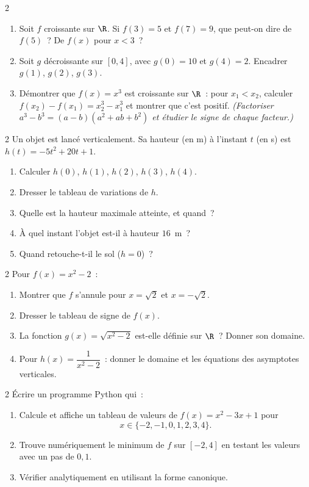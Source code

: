 \begin{exo}{2}
\begin{enumerate}
  \item Soit $f$ croissante sur $\R$. Si $f(3)=5$ et $f(7)=9$, que peut-on
        dire de $f(5)$~? De $f(x)$ pour $x<3$~?
  \item Soit $g$ d\'ecroissante sur $[0,4]$, avec $g(0)=10$ et $g(4)=2$.
        Encadrer $g(1)$, $g(2)$, $g(3)$.
  \item D\'emontrer que $f(x)=x^3$ est croissante sur $\R$~:
        pour $x_1<x_2$, calculer $f(x_2)-f(x_1)=x_2^3-x_1^3$
        et montrer que c'est positif.
        \emph{(Factoriser $a^3-b^3=(a-b)(a^2+ab+b^2)$ et \'etudier
        le signe de chaque facteur.)}
\end{enumerate}
\end{exo}

\begin{exo}{2}
Un objet est lanc\'e verticalement. Sa hauteur (en m) \`a l'instant $t$ (en s)
est $h(t) = -5t^2 + 20t + 1$.
\begin{enumerate}
  \item Calculer $h(0)$, $h(1)$, $h(2)$, $h(3)$, $h(4)$.
  \item Dresser le tableau de variations de $h$.
  \item Quelle est la hauteur maximale atteinte, et quand~?
  \item \`A quel instant l'objet est-il \`a hauteur $16$~m~?
  \item Quand retouche-t-il le sol ($h=0$)~?
\end{enumerate}
\end{exo}

\begin{exo}{2}
Pour $f(x)=x^2-2$~:
\begin{enumerate}
  \item Montrer que $f$ s'annule pour $x=\sqrt{2}$ et $x=-\sqrt{2}$.
  \item Dresser le tableau de signe de $f(x)$.
  \item La fonction $g(x)=\sqrt{x^2-2}$ est-elle d\'efinie sur $\R$~?
        Donner son domaine.
  \item Pour $h(x)=\dfrac{1}{x^2-2}$~: donner le domaine et les
        \'equations des asymptotes verticales.
\end{enumerate}
\end{exo}

\begin{exo}{2}
\'Ecrire un programme Python qui~:
\begin{enumerate}
  \item Calcule et affiche un tableau de valeurs de $f(x)=x^2-3x+1$ pour
        \[x\in\{-2,-1,0,1,2,3,4\}.\]
  \item Trouve num\'eriquement le minimum de $f$ sur $[-2,4]$ en testant
        les valeurs avec un pas de $0{,}1$.
  \item V\'erifier analytiquement en utilisant la forme canonique.
\end{enumerate}
\end{exo}

